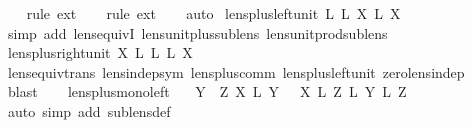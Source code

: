 \begin{isabellebody}
\ \ \isamarkupfalse%
\ {\isacharparenleft}rule\ ext{\isacharparenright}\isanewline
\ \ \isamarkupfalse%
\ {\isacharparenleft}rule\ ext{\isacharparenright}\isanewline
\ \ \isamarkupfalse%
\ {\isacharparenleft}auto{\isacharparenright}\isanewline
{}\isamarkupfalse%
%
\endisatagproof
{\isafoldproof}%
%
\isadelimproof
\isanewline
%
\endisadelimproof
\isanewline
{}\isamarkupfalse%
\ lens{\isacharunderscore}plus{\isacharunderscore}left{\isacharunderscore}unit{\isacharcolon}\ {\isachardoublequoteopen}{}\isactrlsub L\ {\isacharplus}\isactrlsub L\ X\ {\isasymapprox}\isactrlsub L\ X{\isachardoublequoteclose}\isanewline
%
\isadelimproof
\ \ %
\endisadelimproof
%
\isatagproof
{}\isamarkupfalse%
\ {\isacharparenleft}simp\ add{\isacharcolon}\ lens{\isacharunderscore}equivI\ lens{\isacharunderscore}unit{\isacharunderscore}plus{\isacharunderscore}sublens{\isacharunderscore}{}\ lens{\isacharunderscore}unit{\isacharunderscore}prod{\isacharunderscore}sublens{\isacharunderscore}{}{\isacharparenright}%
\endisatagproof
{\isafoldproof}%
%
\isadelimproof
\isanewline
%
\endisadelimproof
\isanewline
{}\isamarkupfalse%
\ lens{\isacharunderscore}plus{\isacharunderscore}right{\isacharunderscore}unit{\isacharcolon}\ {\isachardoublequoteopen}X\ {\isacharplus}\isactrlsub L\ {}\isactrlsub L\ {\isasymapprox}\isactrlsub L\ X{\isachardoublequoteclose}\isanewline
%
\isadelimproof
\ \ %
\endisadelimproof
%
\isatagproof
{}\isamarkupfalse%
\ lens{\isacharunderscore}equiv{\isacharunderscore}trans\ lens{\isacharunderscore}indep{\isacharunderscore}sym\ lens{\isacharunderscore}plus{\isacharunderscore}comm\ lens{\isacharunderscore}plus{\isacharunderscore}left{\isacharunderscore}unit\ zero{\isacharunderscore}lens{\isacharunderscore}indep\ \isamarkupfalse%
\ blast%
\endisatagproof
{\isafoldproof}%
%
\isadelimproof
\isanewline
%
\endisadelimproof
\ \ \isanewline
{}\isamarkupfalse%
\ lens{\isacharunderscore}plus{\isacharunderscore}mono{\isacharunderscore}left{\isacharcolon}\isanewline
\ \ {\isachardoublequoteopen}{\isasymlbrakk}\ Y\ {\isasymbowtie}\ Z{\isacharsemicolon}\ X\ {\isasymsubseteq}\isactrlsub L\ Y\ {\isasymrbrakk}\ {\isasymLongrightarrow}\ X\ {\isacharplus}\isactrlsub L\ Z\ {\isasymsubseteq}\isactrlsub L\ Y\ {\isacharplus}\isactrlsub L\ Z{\isachardoublequoteclose}\isanewline
%
\isadelimproof
\ \ %
\endisadelimproof
%
\isatagproof
{}\isamarkupfalse%
\ {\isacharparenleft}auto\ simp\ add{\isacharcolon}\ sublens{\isacharunderscore}def{\isacharparenright}\isanewline

\end{isabellebody}
